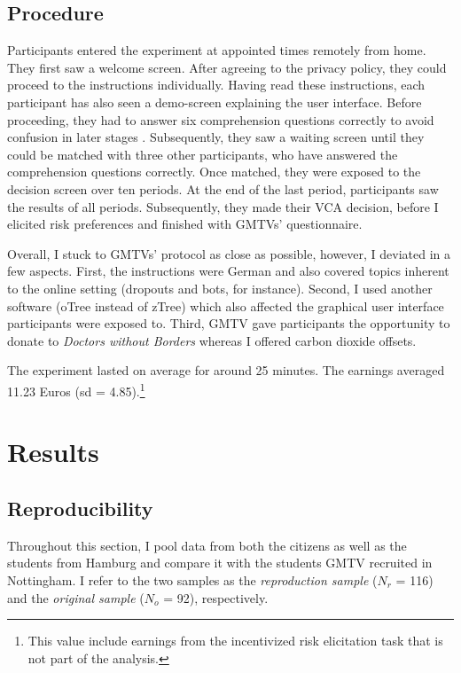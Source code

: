 \documentclass[
  authoryear,
  review,
  3p,
  onecolumn]{elsarticle}
\begin{document}
\hypertarget{sec-procedure}{%
\subsection{Procedure}\label{sec-procedure}}

Participants entered the experiment at appointed times remotely from
home. They first saw a welcome screen. After agreeing to the privacy
policy, they could proceed to the instructions individually. Having read
these instructions, each participant has also seen a demo-screen
explaining the user interface. Before proceeding, they had to answer six
comprehension questions correctly to avoid confusion in later stages
\citep{FerraroVossler2010}. Subsequently, they saw a waiting screen
until they could be matched with three other participants, who have
answered the comprehension questions correctly. Once matched, they were
exposed to the decision screen over ten periods. At the end of the last
period, participants saw the results of all periods. Subsequently, they
made their VCA decision, before I elicited risk preferences
\citep{HoltLaury2002} and finished with GMTVs' questionnaire.

Overall, I stuck to GMTVs' protocol as close as possible, however, I
deviated in a few aspects. First, the instructions were German and also
covered topics inherent to the online setting (dropouts and bots, for
instance). Second, I used another software (oTree instead of zTree)
which also affected the graphical user interface participants were
exposed to. Third, GMTV gave participants the opportunity to donate to
\emph{Doctors without Borders} whereas I offered carbon dioxide offsets.

The experiment lasted on average for around 25 minutes. The earnings
averaged 11.23 Euros (sd = 4.85).\footnote{This value include earnings
  from the incentivized risk elicitation task that is not part of the
  analysis.}

\hypertarget{sec-results}{%
\section{Results}\label{sec-results}}

\hypertarget{sec-replication}{%
\subsection{Reproducibility}\label{sec-replication}}

Throughout this section, I pool data from both the citizens as well as
the students from Hamburg and compare it with the students GMTV
recruited in Nottingham. I refer to the two samples as the
\emph{reproduction sample} (\(N_r\) = 116) and the \emph{original
sample} (\(N_o\) = 92), respectively.
\end{document}
